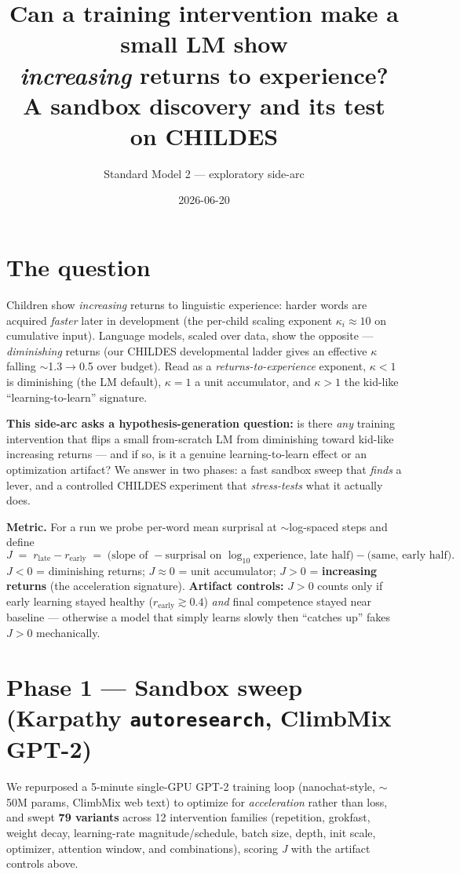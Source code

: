 \documentclass[11pt]{article}
\title{\vspace{-1.5em}Can a training intervention make a small LM show\\\emph{increasing} returns to experience?\\[0.3em]
\large A sandbox discovery and its test on CHILDES}
\author{Standard Model 2 --- exploratory side-arc}
\date{2026-06-20}
\newcommand{\J}{\textit{J}}
\begin{document}
\maketitle
\vspace{-1.5em}

\section{The question}
Children show \emph{increasing} returns to linguistic experience: harder words are acquired
\emph{faster} later in development (the per-child scaling exponent $\kappa_i \approx 10$ on cumulative
input). Language models, scaled over data, show the opposite --- \emph{diminishing} returns (our
CHILDES developmental ladder gives an effective $\kappa$ falling $\sim$1.3$\to$0.5 over budget). Read
as a \emph{returns-to-experience} exponent, $\kappa<1$ is diminishing (the LM default), $\kappa=1$ a
unit accumulator, and $\kappa>1$ the kid-like ``learning-to-learn'' signature.

\textbf{This side-arc asks a hypothesis-generation question:} is there \emph{any} training intervention
that flips a small from-scratch LM from diminishing toward kid-like increasing returns --- and if so,
is it a genuine learning-to-learn effect or an optimization artifact? We answer in two phases: a fast
sandbox sweep that \emph{finds} a lever, and a controlled CHILDES experiment that \emph{stress-tests}
what it actually does.

\medskip
\textbf{Metric.} For a run we probe per-word mean surprisal at $\sim$log-spaced steps and define
\[
\J \;=\; r_{\text{late}} - r_{\text{early}}
\;=\;\big(\text{slope of } -\text{surprisal on } \log_{10}\text{experience, late half}\big)-\big(\text{same, early half}\big).
\]
$\J<0$ = diminishing returns; $\J\!\approx\!0$ = unit accumulator; $\J>0$ = \textbf{increasing returns}
(the acceleration signature). \textbf{Artifact controls:} $\J>0$ counts only if early learning stayed
healthy ($r_{\text{early}}\!\gtrsim\!0.4$) \emph{and} final competence stayed near baseline --- otherwise a
model that simply learns slowly then ``catches up'' fakes $\J>0$ mechanically.

\section{Phase 1 --- Sandbox sweep (Karpathy \texttt{autoresearch}, ClimbMix GPT-2)}
We repurposed a 5-minute single-GPU GPT-2 training loop (nanochat-style, $\sim$50M params, ClimbMix
web text) to optimize for \emph{acceleration} rather than loss, and swept \textbf{79 variants} across 12
intervention families (repetition, grokfast, weight decay, learning-rate magnitude/schedule, batch
size, depth, init scale, optimizer, attention window, and combinations), scoring \J{} with the
artifact controls above.
\end{document}

